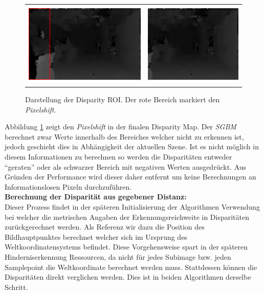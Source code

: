 	\begin{figure}[h]
		\centering
		\begin{tabular}{cc}
			\includegraphics[height=4cm]{img/evaluation/dmap_noroi} &
			\includegraphics[height=4cm]{img/evaluation/dmap_roi}
		\end{tabular}
		\caption{Darstellung der Disparity ROI. Der rote Bereich markiert den \emph{Pixelshift}.}
		\label{fig:dmap_roi}
	\end{figure}

	\noindent
	Abbildung \ref{fig:dmap_roi} zeigt den \emph{Pixelshift} in der finalen Disparity Map. Der \emph{SGBM} berechnet zwar Werte innerhalb des Bereiches welcher nicht zu erkennen ist, jedoch geschieht dies in Abhängigkeit der aktuellen Szene. Ist es nicht möglich in diesem Informationen zu berechnen so werden die Disparitäten entweder \enquote{geraten} oder als schwarzer Bereich mit negativen Werten ausgedrückt. Aus Gründen der Performance wird dieser daher entfernt um keine Berechnungen an Informationslosen Pixeln durchzuführen.\\
	
\noindent
\textbf{Berechnung der Disparität aus gegebener Distanz:}\\
\noindent
Dieser Prozess findet in der späteren Initialisierung der Algorithmen Verwendung bei welcher die metrischen Angaben der Erkennungsreichweite in Disparitäten zurückgerechnet werden. Als Referenz wir dazu die Position des Bildhauptpunktes berechnet welcher sich im Ursprung des Weltkoordinatensystems befindet. Diese Vorgehensweise spart in der späteren Hinderniserkennung Ressourcen, da nicht für jedes Subimage bzw. jeden Samplepoint die Weltkoordinate berechnet werden muss. Stattdessen können die Disparitäten direkt verglichen werden. Dies ist in beiden Algorithmen derselbe Schritt.\\

